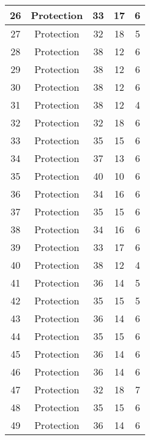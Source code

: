 \documentclass[results.tex]{subfiles}
\begin{document}
\begin{center}
\begin{tabular}{| c || c | c | c | c |}
    \hline
    26 & Protection & 33 & 17 & 6 \\ 
    \hline
    27 & Protection & 32 & 18 & 5 \\ 
    \hline
    28 & Protection & 38 & 12 & 6 \\ 
    \hline
    29 & Protection & 38 & 12 & 6 \\ 
    \hline
    30 & Protection & 38 & 12 & 6 \\ 
    \hline
    31 & Protection & 38 & 12 & 4 \\ 
    \hline
    32 & Protection & 32 & 18 & 6 \\ 
    \hline
    33 & Protection & 35 & 15 & 6 \\ 
    \hline
    34 & Protection & 37 & 13 & 6 \\ 
    \hline
    35 & Protection & 40 & 10 & 6 \\ 
    \hline
    36 & Protection & 34 & 16 & 6 \\ 
    \hline
    37 & Protection & 35 & 15 & 6 \\ 
    \hline
    38 & Protection & 34 & 16 & 6 \\ 
    \hline
    39 & Protection & 33 & 17 & 6 \\ 
    \hline
    40 & Protection & 38 & 12 & 4 \\ 
    \hline
    41 & Protection & 36 & 14 & 5 \\ 
    \hline
    42 & Protection & 35 & 15 & 5 \\ 
    \hline
    43 & Protection & 36 & 14 & 6 \\ 
    \hline
    44 & Protection & 35 & 15 & 6 \\ 
    \hline
    45 & Protection & 36 & 14 & 6 \\ 
    \hline
    46 & Protection & 36 & 14 & 6 \\ 
    \hline
    47 & Protection & 32 & 18 & 7 \\ 
    \hline
    48 & Protection & 35 & 15 & 6 \\ 
    \hline
    49 & Protection & 36 & 14 & 6 \\ 
    \hline   \end{tabular}
\end{center}
\end{document}
